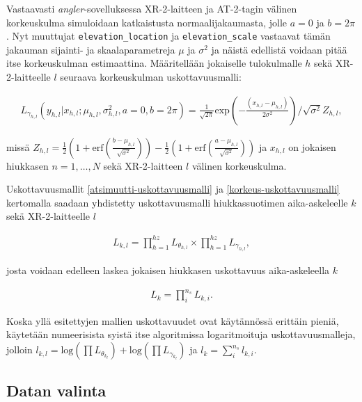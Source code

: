 \documentclass[
  12pt,
  a4paper, twoside]{book}
\begin{document}
Vastaavasti \emph{angler}-sovelluksessa XR-2-laitteen ja AT-2-tagin välinen korkeuskulma simuloidaan katkaistusta normaalijakaumasta, jolle \(a=0\) ja \(b=2 \pi\). Nyt muuttujat \texttt{elevation\_location} ja \texttt{elevation\_scale} vastaavat tämän jakauman sijainti- ja skaalaparametreja \(\mu\) ja \(\sigma^2\) ja näistä edellistä voidaan pitää itse korkeuskulman estimaattina. Määritellään jokaiselle tulokulmalle \(h\) sekä XR-2-laitteelle \(l\) seuraava korkeuskulman uskottavuusmalli:

\begin{align}\label{korkeus-uskottavuusmalli}
L_{\gamma_{h,l}}(y_{h,l}|x_{h,l}; \mu_{h,l}, \sigma^2_{h,l}, a=0, b=2 \pi)=\frac{1}{\sqrt{2 \pi}} \text{exp}(-\frac{(x_{h,l}-\mu_{h,l})}{2 \sigma^2}) / \sqrt{\sigma^2}Z_{h,l},
\end{align}

missä \(Z_{h,l}=\frac{1}{2}(1+\text{erf}(\frac{b-\mu_{h,l}}{\sqrt{\sigma^2}}))-\frac{1}{2}(1+\text{erf}(\frac{a-\mu_{h,l}}{\sqrt{\sigma^2}}))\) ja \(x_{h,l}\) on jokaisen hiukkasen \(n=1,\ldots,N\) sekä XR-2-laitteen \(l\) välinen korkeuskulma.

Uskottavuusmallit \ref{atsimuutti-uskottavuusmalli} ja \ref{korkeus-uskottavuusmalli} kertomalla saadaan yhdistetty uskottavuusmalli hiukkassuotimen aika-askeleelle \(k\) sekä XR-2-laitteelle \(l\)

\begin{align}\label{yhdistetty-uskottavuusmalli}
L_{k,l}=\prod_{h=1}^{hz} L_{\theta_{h,l}} \times \prod_{h=1}^{hz} L_{\gamma_{h,l}},
\end{align}

\noindent josta voidaan edelleen laskea jokaisen hiukkasen uskottavuus aika-askeleella \(k\)

\begin{align}\label{lopullinen-uskottavuusmalli}
L_{k}=\prod_i^{n_s} L_{{k,i}}.
\end{align}

Koska yllä esitettyjen mallien uskottavuudet ovat käytännössä erittäin pieniä, käytetään numeerisista syistä itse algoritmissa logaritmoituja uskottavuusmalleja, jolloin \(l_{k,l} = \text{log}(\prod L_{\theta_{k_l}}) + \text{log}(\prod L_{\gamma_{k_l}})\) ja \(l_k = \sum_i^{n_s} l_{k,i}\).

\hypertarget{datan-valinta}{%
\subsection{Datan valinta}\label{datan-valinta}}
\end{document}
